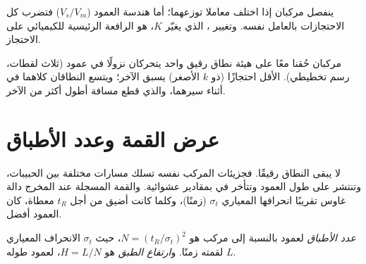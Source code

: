 ينفصل مركبان إذا اختلف معاملا توزعهما؛ أما هندسة العمود ($V_s/V_m$)
فتضرب كل الاحتجازات بالعامل نفسه. وتغيير ، الذي يغيّر $K$، هو الرافعة الرئيسية
للكيميائي على الاحتجاز.

\begin{omfigure}
\par\vspace{4pt}

{\small مركبان حُقنا معًا على هيئة نطاق رقيق واحد يتحركان نزولًا في عمود (ثلاث لقطات،
رسم تخطيطي). الأقل احتجازًا (ذو $k$ الأصغر) يسبق الآخر؛ ويتسع النطاقان كلاهما في أثناء سيرهما، والذي
قطع مسافة أطول أكثر من الآخر.}
\end{omfigure}

\section{عرض القمة وعدد الأطباق}

لا يبقى النطاق رقيقًا. فجزيئات المركب نفسه تسلك مسارات مختلفة بين الحبيبات،
وتنتشر على طول العمود وتتأخر في  بمقادير عشوائية. والقمة المسجلة عند
المخرج دالة غاوس تقريبًا انحرافها المعياري $\sigma_t$ (زمنًا)، وكلما كانت أضيق
من أجل $t_R$ معطاة، كان العمود أفضل.

\begin{definition}\label{def:b2:chromatography:plates}
\emph{عدد الأطباق} لعمود بالنسبة إلى مركب هو $N = (t_R/\sigma_t)^2$، حيث
$\sigma_t$ الانحراف المعياري لقمته زمنًا. و\emph{ارتفاع الطبق} هو
$H = L/N$، لعمود طوله $L$.
\end{definition}

